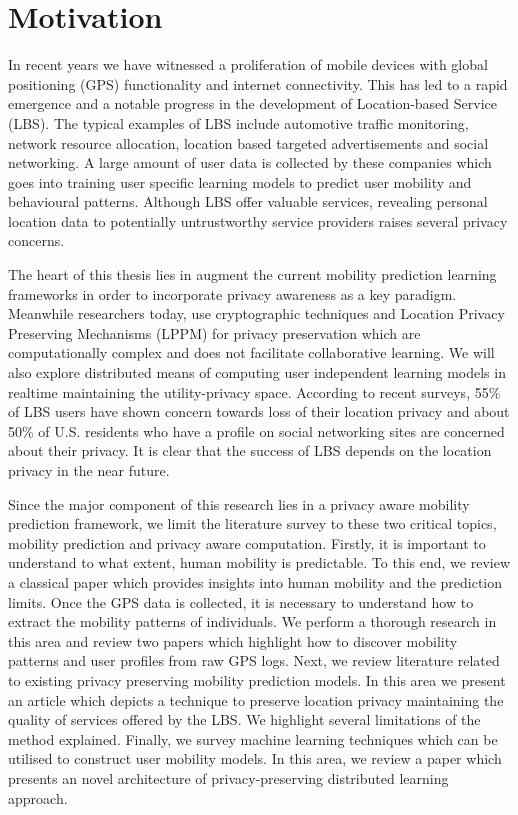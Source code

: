 \newpage
\section{Motivation} \label{motivation}
In recent years we have witnessed a proliferation of mobile devices with global positioning 
(GPS) functionality and internet connectivity. This has led to a rapid emergence and a notable 
progress in the development of Location-based Service (LBS). The typical examples of LBS
include automotive traffic monitoring, network resource allocation, location based 
targeted advertisements and social networking. A large amount of user data is collected by these 
companies which goes into training user specific learning models to predict user mobility and
behavioural patterns. Although LBS offer valuable services, revealing personal location data to
potentially untrustworthy service providers raises several privacy concerns.\newline

The heart of this thesis lies in augment the current mobility prediction learning frameworks in order
to incorporate privacy awareness as a key paradigm. Meanwhile researchers today, use cryptographic
techniques and Location Privacy Preserving Mechanisms (LPPM) for privacy preservation which are 
computationally complex and does not facilitate collaborative learning. We will also explore 
distributed means of computing user independent learning models in realtime maintaining the 
utility-privacy space. According to recent surveys, 55\% of LBS users have shown concern towards 
loss of their location privacy and about 50\% of U.S. residents who have a profile on social 
networking sites are concerned about their privacy. It is clear that the success of LBS depends on 
the location privacy in the near future.\newline

Since the major component of this research lies in a privacy aware mobility prediction framework, we
limit the literature survey to these two critical topics, mobility prediction and privacy aware 
computation. Firstly, it is important to understand to what extent, human mobility is predictable. 
To this end, we review a classical paper which provides insights into human mobility and the 
prediction limits. Once the GPS data is collected, it is necessary to understand how to extract 
the mobility patterns of individuals. We perform a thorough research in this area and review two
papers which highlight how to discover mobility patterns and user profiles from raw GPS logs. Next, 
we review literature related to existing privacy preserving mobility prediction models. In this
area we present an article which depicts a technique to preserve location privacy maintaining the 
quality of services offered by the LBS. We highlight several limitations of the method explained. 
Finally, we survey machine learning techniques which can be utilised to construct user mobility 
models. In this area, we review a paper which presents an novel architecture of privacy-preserving 
distributed learning approach.  



